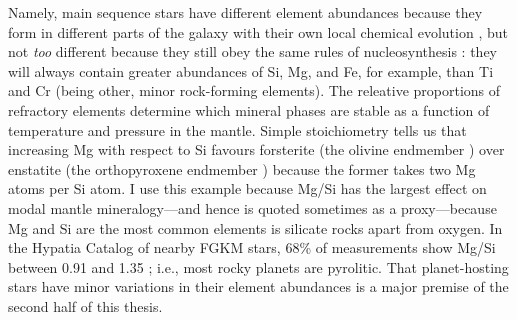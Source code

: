 Namely, main sequence stars have different element abundances because they form in different parts of the galaxy with their own local chemical evolution \citep{hinkel_stellar_2014}, but not \textit{too} different because they still obey the same rules of nucleosynthesis \citep{burbidge_synthesis_1957}: they will always contain greater abundances of Si, Mg, and Fe, for example, than Ti and Cr (being other, minor rock-forming elements). The releative proportions of refractory elements determine which mineral phases are stable as a function of temperature and pressure in the mantle. Simple stoichiometry tells us that increasing Mg with respect to Si favours forsterite (the olivine endmember ) over enstatite (the orthopyroxene endmember ) because the former takes two Mg atoms per Si atom. I use this example because Mg/Si has the largest effect on modal mantle mineralogy---and hence is quoted sometimes as a proxy---because Mg and Si are the most common elements is silicate rocks apart from oxygen. In the Hypatia Catalog of nearby FGKM stars, 68\% of measurements show Mg/Si between 0.91 and 1.35 \citep{hinkel_stellar_2014}; i.e., most rocky planets are pyrolitic. That planet-hosting stars have minor variations in their element abundances is a major premise of the second half of this thesis. 



